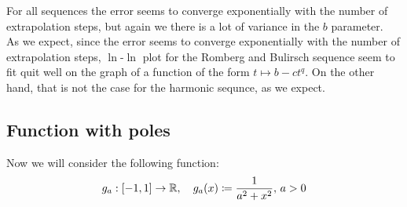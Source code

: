 For all sequences the error seems to converge exponentially with the number of extrapolation steps, but again we there is a lot of variance in the \(b\) parameter.\\

As we expect, since the error seems to converge exponentially with the number of extrapolation steps, \(\ln\)-\(\ln\) plot for the Romberg and Bulirsch sequence seem to fit quit well on the graph of a function of the form \(t \mapsto b - c t^q\). On the other hand, that is not the case for the harmonic sequnce, as we expect.

\subsection{Function with poles}

Now we will consider the following function:
\[
g_a: [-1, 1] \rightarrow \mathbb{R}, \quad g_a(x) \coloneqq \frac{1}{a^2 + x^2},\, a > 0
\]
